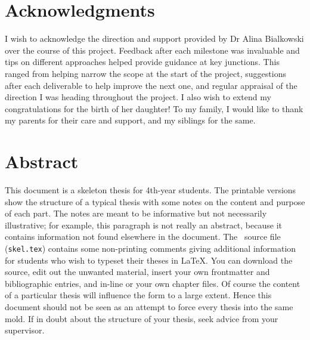 \documentclass[12pt,openany,a4paper]{book}
\begin{document}
\frontmatter



\cleardoublepage



\cleardoublepage


\chapter{Acknowledgments}

I wish to acknowledge the direction and support provided by Dr Alina Bialkowski over the course of this project. Feedback after each milestone was invaluable and tips on different approaches helped provide guidance at key junctions. This ranged from helping narrow the scope at the start of the project, suggestions after each deliverable to help improve the next one, and regular appraisal of the direction I was heading throughout the project. I also wish to extend my congratulations for the birth of her daughter! To my family, I would like to thank my parents for their care and support, and my siblings for the same.
\cleardoublepage

\chapter{Abstract}

This document is a skeleton thesis for 4th-year students.  The
printable versions show the structure of a typical thesis with some notes on the content
and purpose of each part.  The notes are meant to be informative but
not necessarily illustrative; for example, this paragraph is not
really an abstract, because it contains information not found
elsewhere in the document.  The \LaTeXe\ source file
(\texttt{skel.tex}) contains some non-printing comments giving
additional information for students who wish to typeset their theses
in \LaTeX.  You can download the source, edit out the unwanted
material, insert your own frontmatter and bibliographic entries, and
in-line or \verb++ your own chapter files.  Of course the
content of a particular thesis will influence the form to a large
extent.  Hence this document should not be seen as an attempt to force every thesis into the same mold.  If in doubt about the structure of your thesis, seek advice from your supervisor.
\end{document}
